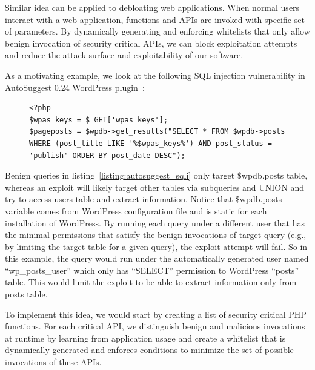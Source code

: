Similar idea can be applied to debloating web applications. When normal users interact with a web application, functions and APIs are invoked with specific set of parameters. By dynamically generating and enforcing whitelists that only allow benign invocation of security critical APIs, we can block exploitation attempts and reduce the attack surface and exploitability of our software.

As a motivating example, we look at the following SQL injection vulnerability in AutoSuggest 0.24 WordPress plugin~\cite{autosuggest_vulnerability}:

\begin{figure}[t]
\begin{lstlisting}[frame=single, caption={PHP code from AutoSuggest WordPress plugin with SQL injection vulnerability},captionpos=b, label={listing:autosuggest_sqli}]
<?php
$wpas_keys = $_GET['wpas_keys'];
$pageposts = $wpdb->get_results("SELECT * FROM $wpdb->posts
WHERE (post_title LIKE '%$wpas_keys%') AND post_status = 'publish' ORDER BY post_date DESC");
\end{lstlisting}
\end{figure}

Benign queries in listing~\ref{listing:autosuggest_sqli} only target \$wpdb.posts table, whereas an exploit will likely target other tables via subqueries and UNION and try to access users table and extract information. Notice that \$wpdb.posts variable comes from WordPress configuration file and is static for each installation of WordPress.
By running each query under a different user that has the minimal permissions that satisfy the benign invocations of target query (e.g., by limiting the target table for a given query), the exploit attempt will fail.
So in this example, the query would run under the automatically generated user named ``wp\_posts\_user'' which only has ``SELECT'' permission to WordPress ``posts'' table. This would limit the exploit to be able to extract information only from posts table.

To implement this idea, we would start by creating a list of security critical PHP functions.
For each critical API, we distinguish benign and malicious invocations at runtime by learning from application usage and create a whitelist that is dynamically generated and enforces conditions to minimize the set of possible invocations of these APIs.


